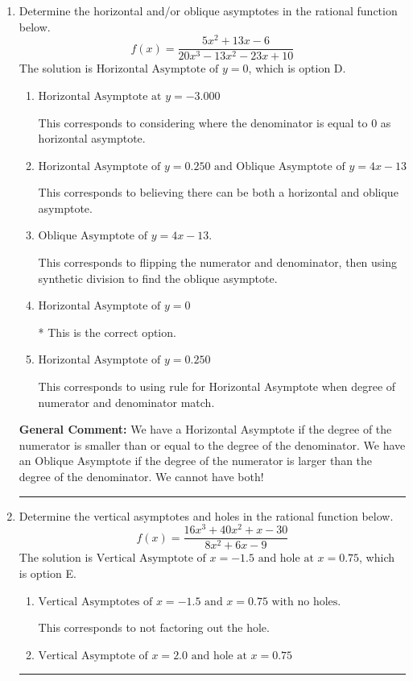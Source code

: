 \documentclass{extbook}[14pt]
\newcommand{\litem}[1]{\item #1

\rule{\textwidth}{0.4pt}}
\begin{document}
\begin{enumerate}\litem{
Determine the horizontal and/or oblique asymptotes in the rational function below.
\[ f(x) = \frac{5x^{2} +13 x -6}{20x^{3} -13 x^{2} -23 x + 10} \]The solution is \( \text{Horizontal Asymptote of } y = 0 \), which is option D.\begin{enumerate}[label=\Alph*.]
\item \( \text{Horizontal Asymptote at } y = -3.000 \)

This corresponds to considering where the denominator is equal to 0 as horizontal asymptote.
\item \( \text{Horizontal Asymptote of } y = 0.250 \text{ and Oblique Asymptote of } y = 4x -13 \)

This corresponds to believing there can be both a horizontal and oblique asymptote.
\item \( \text{Oblique Asymptote of } y = 4x -13. \)

This corresponds to flipping the numerator and denominator, then using synthetic division to find the oblique asymptote.
\item \( \text{Horizontal Asymptote of } y = 0 \)

* This is the correct option.
\item \( \text{Horizontal Asymptote of } y = 0.250  \)

This corresponds to using rule for Horizontal Asymptote when degree of numerator and denominator match.
\end{enumerate}

\textbf{General Comment:} We have a Horizontal Asymptote if the degree of the numerator is smaller than or equal to the degree of the denominator. We have an Oblique Asymptote if the degree of the numerator is larger than the degree of the denominator. We cannot have both!
}
\litem{
Determine the vertical asymptotes and holes in the rational function below.
\[ f(x) = \frac{16x^{3} +40 x^{2} +x -30}{8x^{2} +6 x -9} \]The solution is \( \text{Vertical Asymptote of } x = -1.5 \text{ and hole at } x = 0.75 \), which is option E.\begin{enumerate}[label=\Alph*.]
\item \( \text{Vertical Asymptotes of } x = -1.5 \text{ and } x = 0.75 \text{ with no holes.} \)

This corresponds to not factoring out the hole.
\item \( \text{Vertical Asymptote of } x = 2.0 \text{ and hole at } x = 0.75 \)


\end{enumerate}}
\end{enumerate}
\end{document}
